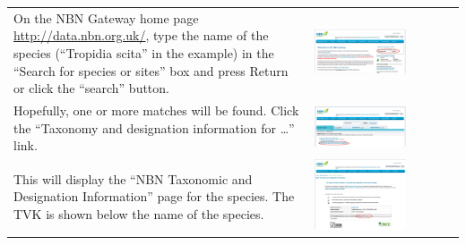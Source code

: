 \documentclass{article}
\begin{document}
\begin{enumerate}
\begin{tabular}{ p{} m{} }
  \item On the NBN Gateway home page \url{http://data.nbn.org.uk/}, type the
  name of the species (``Tropidia scita'' in the example) in the ``Search for
  species or sites'' box and press Return or click the ``search'' button.
  &
  \includegraphics[width=0.66\textwidth]{NBN_search.png}
  \\
  \item Hopefully, one or more matches will be found. Click the ``Taxonomy and
  designation information for \ldots'' link.
  &
  \includegraphics[width=0.66\textwidth]{NBN_search_result.png}
  \\
  \item This will display the ``NBN Taxonomic and Designation Information'' page
  for the species. The TVK is shown below the name of the species.
  &
  \includegraphics[width=0.66\textwidth]{NBN_species_taxonomy.png}
  \\
\end{tabular}
\end{enumerate}
\end{document}
